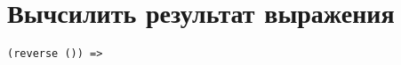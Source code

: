 
\section{Вычсилить результат выражения}

\problem \hfill

\begin{lstlisting}
(reverse ()) =>
\end{lstlisting}